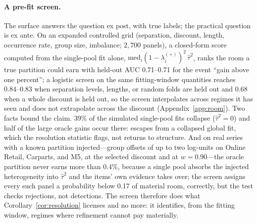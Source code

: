 
\paragraph{A pre-fit screen.}
The surface answers the question ex post, with true labels; the
practical question is ex ante. On an expanded controlled grid
(separation, discount, length, occurrence rate, group size, imbalance;
$2{,}700$ panels), a closed-form score computed from the single-pool fit
alone, $\mathrm{med}_i(1-\lambda_i^{(+)})^2\,\hat\tau^2$, ranks the room a
true partition could earn with held-out AUC 0.71--0.71 for
the event ``gain above one percent''; a logistic screen on the same
fitting-window quantities reaches 0.84--0.83 when separation
levels, lengths, or random folds are held out and 0.68 when a
whole discount is held out, so the screen interpolates across regimes it
has seen and does not extrapolate across the discount
(Appendix~\ref{app:room}). Two facts bound the claim. 39\% of the
simulated single-pool fits collapse ($\hat\tau^2=0$) and half of the
large oracle gains occur there: escapes from a collapsed global fit,
which the resolution statistic flags, not returns to structure. And on
real series with a known partition injected---group offsets of up to two
log-units on Online Retail, Carparts, and M5, at the selected discount and
at $w=0.90$---the oracle partition never earns more than 0.4\%,
because a single pool absorbs the injected heterogeneity into
$\hat\tau^2$ and the items' own evidence takes over; the screen assigns
every such panel a probability below 0.17 of material room,
correctly, but the test checks rejections, not detections. The screen
therefore does what Corollary~\ref{cor:resolution} licenses and no more:
it identifies, from the fitting window, regimes where refinement cannot
pay materially.
